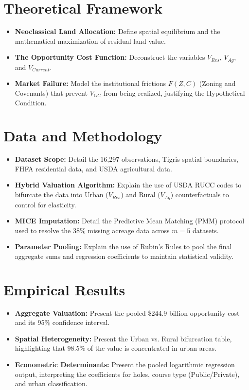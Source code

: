 \documentclass[10pt, letterpaper]{article}
\begin{document}
\section{Theoretical Framework}
\begin{itemize}
    \item \textbf{Neoclassical Land Allocation:} Define spatial equilibrium and the mathematical maximization of residual land value.
    \item \textbf{The Opportunity Cost Function:} Deconstruct the variables $V_{Res}$, $V_{Ag}$, and $V_{Current}$.
    \item \textbf{Market Failure:} Model the institutional frictions $F(Z, C)$ (Zoning and Covenants) that prevent $V_{OC}$ from being realized, justifying the Hypothetical Condition.
\end{itemize}

\section{Data and Methodology}
\begin{itemize}
    \item \textbf{Dataset Scope:} Detail the 16,297 observations, Tigris spatial boundaries, FHFA residential data, and USDA agricultural data.
    \item \textbf{Hybrid Valuation Algorithm:} Explain the use of USDA RUCC codes to bifurcate the data into Urban ($V_{Res}$) and Rural ($V_{Ag}$) counterfactuals to control for elasticity.
    \item \textbf{MICE Imputation:} Detail the Predictive Mean Matching (PMM) protocol used to resolve the 38\% missing acreage data across $m=5$ datasets.
    \item \textbf{Parameter Pooling:} Explain the use of Rubin's Rules to pool the final aggregate sums and regression coefficients to maintain statistical validity.
\end{itemize}

\section{Empirical Results}
\begin{itemize}
    \item \textbf{Aggregate Valuation:} Present the pooled \$244.9 billion opportunity cost and its 95\% confidence interval.
    \item \textbf{Spatial Heterogeneity:} Present the Urban vs. Rural bifurcation table, highlighting that 98.5\% of the value is concentrated in urban areas.
    \item \textbf{Econometric Determinants:} Present the pooled logarithmic regression output, interpreting the coefficients for holes, course type (Public/Private), and urban classification.
\end{itemize}
\end{document}
